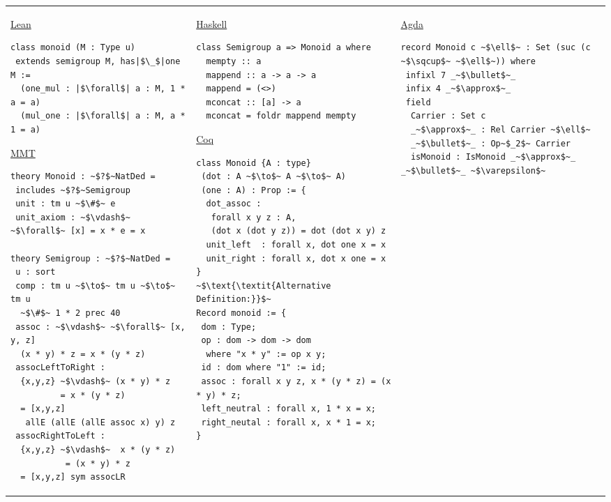 \footnotesize
\begin{adjustbox}{width=1.2\columnwidth,center}
\begin{tabular}{p{7cm} p{7cm} p{7cm}}  
\underline{Lean}
\begin{verbatim} 
class monoid (M : Type u)
 extends semigroup M, has|$\_$|one M :=
  (one_mul : |$\forall$| a : M, 1 * a = a) 
  (mul_one : |$\forall$| a : M, a * 1 = a)   
\end{verbatim} 
\vspace{0.5cm}
\underline{MMT}
\begin{verbatim}
theory Monoid : ~$?$~NatDed = 
 includes ~$?$~Semigroup 
 unit : tm u ~$\#$~ e 
 unit_axiom : ~$\vdash$~ ~$\forall$~ [x] = x * e = x    
 
theory Semigroup : ~$?$~NatDed = 
 u : sort 
 comp : tm u ~$\to$~ tm u ~$\to$~ tm u 
  ~$\#$~ 1 * 2 prec 40
 assoc : ~$\vdash$~ ~$\forall$~ [x, y, z]
  (x * y) * z = x * (y * z)    
 assocLeftToRight : 
  {x,y,z} ~$\vdash$~ (x * y) * z 
          = x * (y * z) 
  = [x,y,z] 
   allE (allE (allE assoc x) y) z
 assocRightToLeft : 
  {x,y,z} ~$\vdash$~  x * (y * z) 
           = (x * y) * z 
  = [x,y,z] sym assocLR    
\end{verbatim}     
&
\underline{Haskell}
\begin{verbatim}
class Semigroup a => Monoid a where 
  mempty :: a 
  mappend :: a -> a -> a 
  mappend = (<>) 
  mconcat :: [a] -> a 
  mconcat = foldr mappend mempty 
\end{verbatim} 
\vspace{0.5cm}
\underline{Coq}
\begin{verbatim}
class Monoid {A : type}
 (dot : A ~$\to$~ A ~$\to$~ A)
 (one : A) : Prop := {
  dot_assoc : 
   forall x y z : A, 
   (dot x (dot y z)) = dot (dot x y) z
  unit_left  : forall x, dot one x = x 
  unit_right : forall x, dot x one = x              
}
~$\text{\textit{Alternative Definition:}}$~
Record monoid := {
 dom : Type; 
 op : dom -> dom -> dom 
  where "x * y" := op x y; 
 id : dom where "1" := id; 
 assoc : forall x y z, x * (y * z) = (x * y) * z; 
 left_neutral : forall x, 1 * x = x; 
 right_neutal : forall x, x * 1 = x; 
}
\end{verbatim} 
&
\underline{Agda}
\begin{verbatim} 
record Monoid c ~$\ell$~ : Set (suc (c ~$\sqcup$~ ~$\ell$~)) where 
 infixl 7 _~$\bullet$~_
 infix 4 _~$\approx$~_
 field 
  Carrier : Set c 
  _~$\approx$~_ : Rel Carrier ~$\ell$~ 
  _~$\bullet$~_ : Op~$_2$~ Carrier 
  isMonoid : IsMonoid _~$\approx$~_ _~$\bullet$~_ ~$\varepsilon$~ 
  

\end{verbatim}
\end{tabular}
\end{adjustbox}
